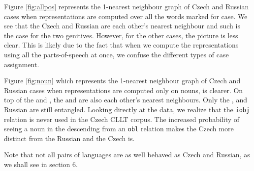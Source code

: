 

Figure \ref{fig:allpos} represents the 1-nearest neighbour graph of Czech and Russian cases when representations are computed over all the words marked for case.
We see that the Czech and Russian  are each other's nearest neighbour and such is the case for the two genitives.
However, for the other cases, the picture is less clear.
This is likely due to the fact that when we compute the representations using all the parts-of-speech at once, we confuse the different types of case assignment.

Figure \ref{fig:noun} which represents the 1-nearest neighbour graph of Czech and Russian cases when representations are computed only on nouns, is clearer.
On top of the  and , the  and  are also each other's nearest neighbours.
Only the ,  and Russian  are still entangled.
Looking directly at the data, we realize that the \texttt{iobj} relation is never used in the Czech CLLT corpus.
The increased probability of seeing a noun in the  descending from an \texttt{obl} relation makes the Czech  more distinct from the Russian  and the Czech  is.

Note that not all pairs of languages are as well behaved as Czech and Russian, as we shall see in section 6.




